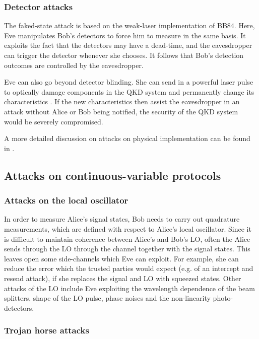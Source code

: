 \subsubsection{Detector attacks}

The faked-state attack is based on the weak-laser implementation of BB84. Here, Eve manipulates Bob's detectors to force him to measure in the same basis. It exploits the fact that the detectors may have a dead-time, and the eavesdropper can trigger the detector whenever she chooses. It follows that Bob's detection outcomes are controlled by the eavesdropper.

Eve can also go beyond detector blinding. She can send in a powerful laser pulse to optically damage components in the QKD system and permanently change its characteristics \cite{bib:jain2016attacks}. If the new characteristics then assist the eavesdropper in an attack without Alice or Bob being notified, the security of the QKD system would be severely compromised.

A more detailed discussion on attacks on physical implementation can be found in \cite{bib:jain2016attacks}.

\subsection{Attacks on continuous-variable protocols}

\subsubsection{Attacks on the local oscillator}


In order to measure Alice's signal states, Bob needs to carry out quadrature measurements, which
are defined with respect to Alice's local oscillator. Since it is difficult to maintain coherence 
between Alice's and Bob's LO, often the Alice sends through the LO through the channel together with the signal states. This leaves open some side-channels which Eve can exploit. For example, she can reduce the error which the trusted parties would expect (e.g. of an intercept and resend attack), if she replaces the signal and LO with squeezed states. Other attacks of the LO include Eve exploiting the wavelength dependence of the beam splitters, shape of the LO pulse, phase noises and the non-linearity photo-detectors.




\subsubsection{Trojan horse attacks}


